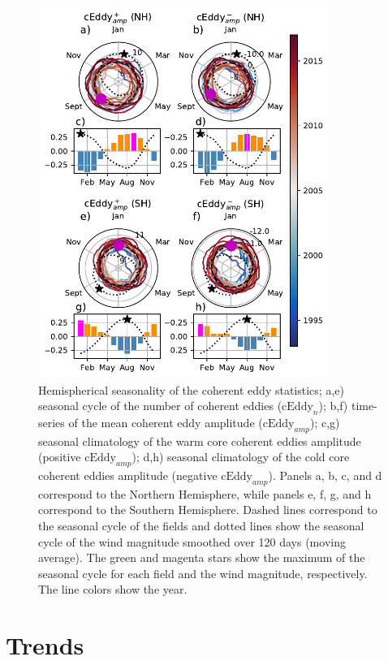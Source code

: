 \documentclass[draft,linenumbers]{agujournal2019}
\newcommand{\cEddy}{\textrm{cEddy}}
\begin{document}
	\begin{figure}
	    \centering
	    \includegraphics[width=95mm]{figures/All_polar_plots_eddy_stats_polarity_V4.pdf}
	    \caption{Hemispherical seasonality of the coherent eddy statistics;
		a,e) seasonal cycle of the number of coherent eddies ($\cEddy_n$); b,f) time-series of the mean coherent eddy amplitude ($\cEddy_{amp}$); c,g) seasonal climatology of the warm core coherent eddies amplitude (positive $\cEddy_{amp}$); d,h) seasonal climatology of the cold core coherent eddies amplitude (negative $\cEddy_{amp}$). Panels a, b, c, and d correspond to the Northern Hemisphere, while panels e, f, g, and h correspond to the Southern Hemisphere. Dashed lines correspond to the seasonal cycle of the fields and dotted lines show the seasonal cycle of the wind magnitude smoothed over 120 days (moving average). The green and magenta stars show the maximum of the seasonal cycle for each field and the wind magnitude, respectively. The line colors show the year.}
	    \label{fig:eddy_stats_polar}
	\end{figure}

	\section{Trends}
	\label{sec:CE_trends}	
	
\end{document}
